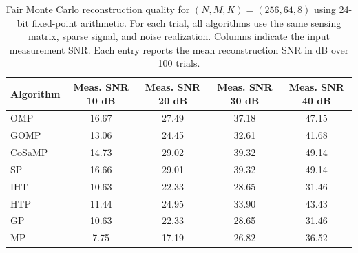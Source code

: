 \begin{table}[!t]
\centering
\caption{Fair Monte Carlo reconstruction quality for \((N,M,K)=(256,64,8)\) using 24-bit fixed-point arithmetic. 
For each trial, all algorithms use the same sensing matrix, sparse signal, and noise realization. 
Columns indicate the input measurement SNR. Each entry reports the mean reconstruction SNR in dB over 100 trials.}
\label{tab:fair_reconstruction_snr}
\footnotesize
\setlength{\tabcolsep}{5pt}
\renewcommand{\arraystretch}{1.12}
\begin{tabular}{lcccc}
\hline
Algorithm & Meas. SNR 10 dB & Meas. SNR 20 dB & Meas. SNR 30 dB & Meas. SNR 40 dB \\
\hline
OMP    & 16.67 & 27.49 & 37.18 & 47.15 \\
GOMP   & 13.06 & 24.45 & 32.61 & 41.68 \\
CoSaMP & 14.73 & 29.02 & 39.32 & 49.14 \\
SP     & 16.66 & 29.01 & 39.32 & 49.14 \\
IHT    & 10.63 & 22.33 & 28.65 & 31.46 \\
HTP    & 11.44 & 24.95 & 33.90 & 43.43 \\
GP     & 10.63 & 22.33 & 28.65 & 31.46 \\
MP     &  7.75 & 17.19 & 26.82 & 36.52 \\
\hline
\end{tabular}
\end{table}
